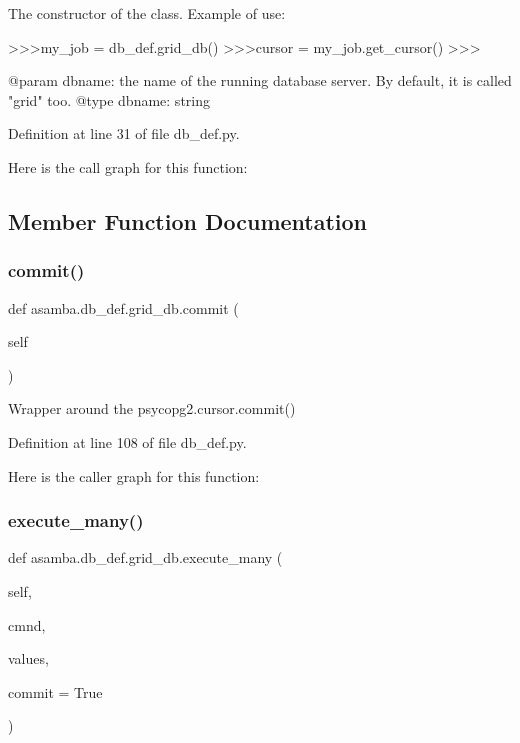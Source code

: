 \begin{DoxyVerb}The constructor of the class. Example of use:

>>>my_job = db_def.grid_db()
>>>cursor = my_job.get_cursor()
>>>

@param dbname: the name of the running database server. By default, it is called "grid" too.
@type dbname: string
\end{DoxyVerb}
 

Definition at line 31 of file db\+\_\+def.\+py.

Here is the call graph for this function\+:


\subsection{Member Function Documentation}
\mbox{\label{classasamba_1_1db__def_1_1grid__db_ab9bebf7f7c59d58113210aa514e20000}} 
\subsubsection{\texorpdfstring{commit()}{commit()}}
{\footnotesize\ttfamily def asamba.\+db\+\_\+def.\+grid\+\_\+db.\+commit (\begin{DoxyParamCaption}\item[{}]{self }\end{DoxyParamCaption})}

\begin{DoxyVerb}Wrapper around the psycopg2.cursor.commit()
\end{DoxyVerb}
 

Definition at line 108 of file db\+\_\+def.\+py.

Here is the caller graph for this function\+:
\mbox{\label{classasamba_1_1db__def_1_1grid__db_af8c4c50b39e4fb32a27e4f696240d806}} 
\subsubsection{\texorpdfstring{execute\+\_\+many()}{execute\_many()}}
{\footnotesize\ttfamily def asamba.\+db\+\_\+def.\+grid\+\_\+db.\+execute\+\_\+many (\begin{DoxyParamCaption}\item[{}]{self,  }\item[{}]{cmnd,  }\item[{}]{values,  }\item[{}]{commit = {\ttfamily True} }\end{DoxyParamCaption})}

